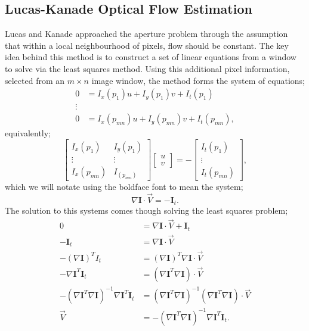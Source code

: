 \subsection{Lucas-Kanade Optical Flow Estimation}

\IEEEPARstart{}{} Lucas and Kanade approached the aperture problem through the assumption that within a local neighbourhood of pixels, flow should be constant. The key idea behind this method is to construct a set of linear equations from a window to solve via the least squares method. Using this additional pixel information, selected from an $m \times n$ image window, the method forms the system of equations;
\begin{align*}
    0 &= I_x(p_1) u + I_y(p_1) v + I_t(p_1) \\
    \vdots & \\
    0 &= I_x(p_{m n}) u + I_y(p_{m n}) v + I_t(p_{m n}),
\end{align*}
equivalently;
\begin{equation*}
    \begin{bmatrix}
        I_x(p_1) & I_y(p_1) \\
        \vdots & \vdots \\
        I_x(p_{m n}) & I_(p_{m n}) 
    \end{bmatrix}
    \begin{bmatrix}
        u \\
        v
    \end{bmatrix}
    = 
    - \begin{bmatrix}
        I_t(p_1) \\
        \vdots \\
        I_t(p_{m n})
    \end{bmatrix},
\end{equation*}
which we will notate using the boldface font to mean the system;
\begin{equation}
	\nabla \mathbf{I} \cdot \vec{V} = - \mathbf{I}_t.
\end{equation}
The solution to this systems comes though solving the least squares problem;
\begin{align*}
    0 &= \nabla \mathbf{I} \cdot \vec{V} + \mathbf{I}_t \\
    - \mathbf{I}_t &= \nabla \mathbf{I} \cdot \vec{V} \\
    - (\nabla \mathbf{I})^T I_t &= (\nabla \mathbf{I})^{T} \nabla \mathbf{I} \cdot \vec{V} \\
    - \nabla \mathbf{I}^T \mathbf{I}_t &= (\nabla \mathbf{I}^{T} \nabla \mathbf{I}) \cdot \vec{V} \\
    - (\nabla \mathbf{I}^{T} \nabla \mathbf{I})^{-1} \nabla \mathbf{I}^T \mathbf{I}_t &= (\nabla \mathbf{I}^{T} \nabla \mathbf{I})^{-1}(\nabla \mathbf{I}^{T} \nabla \mathbf{I}) \cdot \vec{V} \\
    \vec{V} &= -(\nabla \mathbf{I}^{T} \nabla \mathbf{I})^{-1} \nabla \mathbf{I}^T \mathbf{I}_t.
\end{align*}
